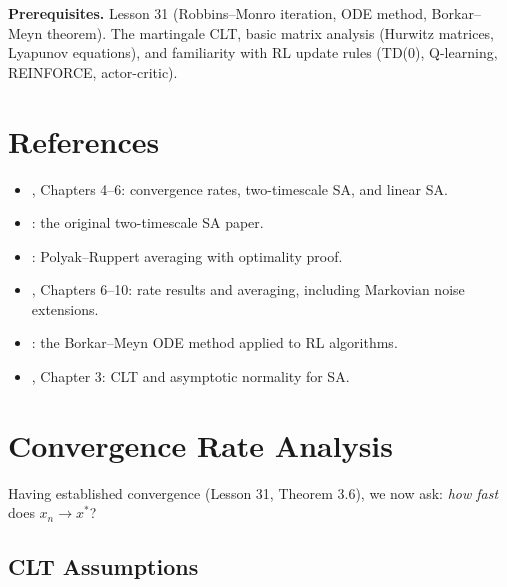\documentclass[11pt,a4paper]{article}
\begin{document}
\medskip
\noindent\textbf{Prerequisites.} Lesson 31 (Robbins--Monro iteration,
ODE method, Borkar--Meyn theorem). The martingale CLT, basic matrix
analysis (Hurwitz matrices, Lyapunov equations), and familiarity with
RL update rules (TD(0), Q-learning, REINFORCE, actor-critic).


\section{References}
\label{sec:references}

\begin{itemize}[leftmargin=2em]
  \item \citet{borkar2008}, Chapters 4--6: convergence rates,
    two-timescale SA, and linear SA.
  \item \citet{borkar1997}: the original two-timescale SA paper.
  \item \citet{polyak1992}: Polyak--Ruppert averaging with optimality
    proof.
  \item \citet{kushner2003}, Chapters 6--10: rate results and
    averaging, including Markovian noise extensions.
  \item \citet{borkar2000}: the Borkar--Meyn ODE method applied to
    RL algorithms.
  \item \citet{benveniste2012}, Chapter 3: CLT and asymptotic
    normality for SA.
\end{itemize}


\section{Convergence Rate Analysis}
\label{sec:clt}

Having established convergence (Lesson 31, Theorem 3.6), we now ask:
\emph{how fast} does $x_n \to x^*$?

\subsection{CLT Assumptions}
\end{document}
